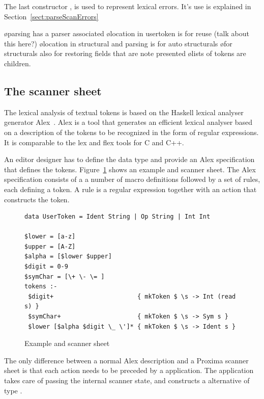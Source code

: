 \documentclass[12pt]{article}
\begin{document}
The last constructor , is used to represent lexical errors. It's use is explained in Section~\ref{sect:parseScanErrors}

\bl
\o parsing has a parser associated
\o location in usertoken is for reuse (talk about this here?)
\o location in structural and parsing is for auto structurals
\o for structurals also for restoring fields that are note presented
\o lists of tokens are children.
\el


\subsection{The scanner sheet}

The lexical analysis of textual tokens is based on the Haskell lexical analyser generator Alex~\cite{marlow07alex}. Alex is a tool that generates an efficient lexical analyser based on a description of the tokens to be recognized in the form of regular expressions. It is comparable to the lex and flex tools for C and C++.

An editor designer has to define the data type  and provide an Alex specification that defines the tokens. Figure~\ref{fig:scannerSheet} shows an example  and scanner sheet. The Alex specification consists of a a number of macro definitions followed by a set of rules, each defining a token. A rule is a regular expression together with an action that constructs the token.

\begin{figure}
\begin{center}
\begin{footnotesize}
\begin{verbatim}
data UserToken = Ident String | Op String | Int Int

$lower = [a-z]
$upper = [A-Z]
$alpha = [$lower $upper]
$digit = 0-9		
$symChar = [\+ \- \= ]
tokens :-
 $digit+                       { mkToken $ \s -> Int (read s) }
 $symChar+                     { mkToken $ \s -> Sym s }
 $lower [$alpha $digit \_ \']* { mkToken $ \s -> Ident s }
\end{verbatim} %
\end{footnotesize}
\caption{Example  and scanner sheet} \label{fig:scannerSheet} 
\end{center}
\end{figure}

The only difference between a normal Alex description and a Proxima scanner sheet is that each action needs to be preceded by a  application. The  application takes care of passing the internal scanner state, and constructs a  alternative of type . 
\end{document}
